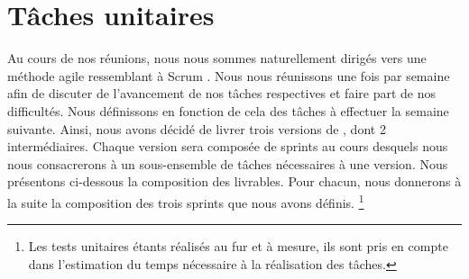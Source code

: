 \section{Tâches unitaires}
	\label{sec:taches_unitaires}

	Au cours de nos réunions, nous nous sommes naturellement dirigés vers une méthode agile ressemblant à \og Scrum \fg. Nous nous réunissons une fois par semaine afin de discuter de l'avancement de nos tâches respectives et faire part de nos difficultés. Nous définissons en fonction de cela des tâches à effectuer la semaine suivante. Ainsi, nous avons décidé de livrer trois versions de \glasir{}, dont 2 intermédiaires.
	Chaque version sera composée de sprints au cours desquels nous nous consacrerons à un sous-ensemble de tâches nécessaires à une version. %
	Nous présentons ci-dessous la composition des livrables. Pour chacun, nous donnerons à la suite la composition des trois sprints que nous avons définis.
	\footnote{Les tests unitaires étants réalisés au fur et à mesure, ils sont pris en compte dans l'estimation du temps nécessaire à la réalisation des tâches.}

